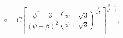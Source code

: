 \begin{equation}
a = C\left[\frac{\psi^2-3}{(\psi-\beta)^2}
\left(\frac{\psi-\sqrt3}{\psi+\sqrt3}\right)^{\frac{\beta}{\sqrt3}}
\right]^{\frac{\beta-1}{\beta^2-3}},
\end{equation}

